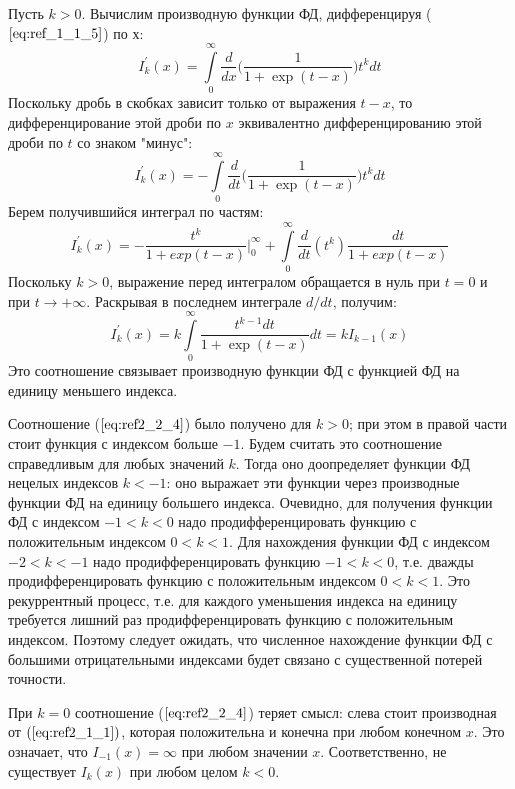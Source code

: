 Пусть $k > 0$. Вычислим производную функции ФД, дифференцируя ($\ref{eq:ref_1_1_5}$) по $х$:
\begin{equation}
I_{k}^{'}(x) = \int\limits_0^{\infty} \frac{d}{dx}\bigg(\frac{1}{1+\exp{(t-x)}}\bigg)t^{k}dt
\label{eq:ref2_2_1}
\end{equation}
Поскольку дробь в скобках зависит только от выражения $t - x$, то
дифференцирование этой дроби по $x$ эквивалентно дифференцированию этой
дроби по $t$ со знаком "минус":
\begin{equation}
I_{k}^{'}(x) = -\int\limits_0^{\infty} \frac{d}{dt}\bigg(\frac{1}{1+\exp{(t-x)}}\bigg)t^{k}dt
\label{eq:ref2_2_2}
\end{equation}
Берем получившийся интеграл по частям:
\begin{equation}
I_{k}^{'}(x) = -\frac{t^{k}}{1+exp{(t-x)}}\bigg|_0^{\infty} + \int\limits_0^{\infty} \frac{d}{dt}(t^k)\frac{dt}{1+exp{(t-x)}}
\label{eq:ref2_2_3}
\end{equation}
Поскольку $k > 0$, выражение перед интегралом обращается в нуль при $t = 0$ и
при $t \to +\infty$. Раскрывая в последнем интеграле $d/dt$, получим:
\begin{equation}
I_{k}^{'}(x) = k\int\limits_0^{\infty} \frac{t^{k-1}dt}{1+\exp{(t-x)}}dt = kI_{k-1}(x)
\label{eq:ref2_2_4}
\end{equation}
Это соотношение связывает производную функции ФД с функцией ФД на
единицу меньшего индекса.

Соотношение ($\ref{eq:ref2_2_4}$) было получено для $k > 0$; при этом в правой части стоит
функция с индексом больше $-1$. Будем считать это соотношение справедливым
для любых значений $k$. Тогда оно доопределяет функции ФД нецелых индексов
$k < -1$: оно выражает эти функции через производные функции ФД на единицу
большего индекса. Очевидно, для получения функции ФД с индексом $-1 < k < 0$
надо продифференцировать функцию с положительным индексом $0 < k < 1$. Для
нахождения функции ФД с индексом $-2 < k < -1$ надо продифференцировать
функцию $-1 < k < 0$, т.е. дважды продифференцировать функцию с
положительным индексом $0 < k < 1$. Это рекуррентный процесс, т.е. для
каждого уменьшения индекса на единицу требуется лишний раз
продифференцировать функцию с положительным индексом. Поэтому следует
ожидать, что численное нахождение функции ФД с большими отрицательными
индексами будет связано с существенной потерей точности.

При $k = 0$ соотношение ($\ref{eq:ref2_2_4}$) теряет смысл: слева стоит производная от $(\ref{eq:ref2_1_1})$,
которая положительна и конечна при любом конечном $x$. Это означает, что
$I_{-1}(x) = \infty$ при любом значении $x$. Соответственно, не существует $I_k(x)$ при
любом целом $k < 0$.
\\

